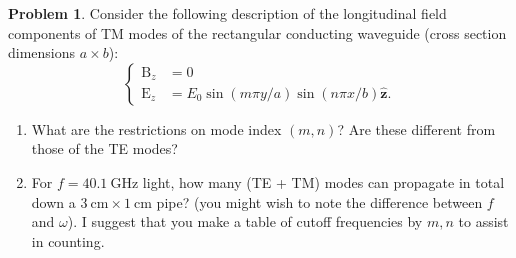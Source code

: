 \documentclass[10pt]{article}
\theoremstyle{definition}
\newtheorem{problem}{Problem}
\newcommand{\uz}{\hat{\mathbf{z}}}
\newcommand{\bv}[1]{\bm{\mathrm{#1}}}
\begin{document}
\begin{problem}
Consider the following description of the longitudinal field components of TM
modes of the rectangular conducting waveguide (cross section dimensions $a\times b$):
$$
  \begin{cases}
    \bv{B}_z & =0                                   \\
    \bv{E}_z & =E_0\sin(m\pi y/a)\sin(n\pi x/b)\uz.
  \end{cases}
$$
\begin{enumerate}[label=(\alph*)]
  \item What are the restrictions on mode index $(m,n)$? Are these different from
        those of the TE modes?
  \item For $f=\qty{40.1}{\giga\hertz}$ light, how many (TE + TM) modes can propagate in total
        down a $\qty{3}{\centi\meter}\times\qty{1}{\centi\meter}$ pipe? (you might wish to note the difference between $f$
        and $\omega$). I suggest that you make a table of cutoff frequencies by $m,n$ to
        assist in counting.
\end{enumerate}
\end{problem}
\end{document}
